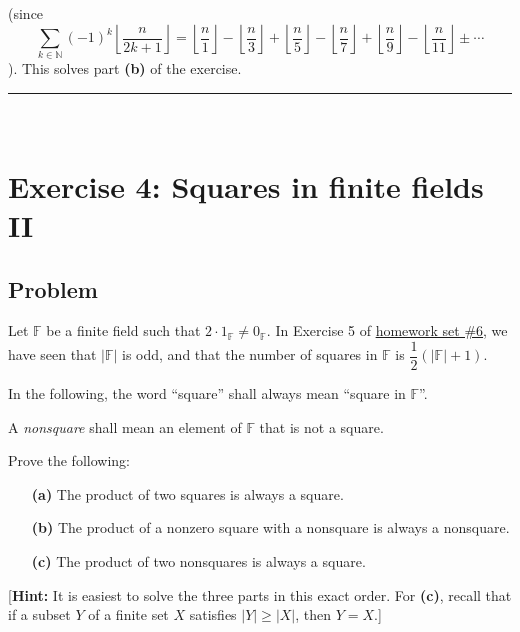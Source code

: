 \documentclass[paper=a4, fontsize=12pt]{scrartcl}%
\let\sumnonlimits\sum
\renewcommand{\sum}{\sumnonlimits\limits}
\theoremstyle{plainsl}
\theoremstyle{definition}
\theoremstyle{remark}
\begin{document}
(since
\[
\sum_{k\in\mathbb{N}}\left(  -1\right)  ^{k}\left\lfloor \dfrac{n}%
{2k+1}\right\rfloor =\left\lfloor \dfrac{n}{1}\right\rfloor -\left\lfloor
\dfrac{n}{3}\right\rfloor +\left\lfloor \dfrac{n}{5}\right\rfloor
-\left\lfloor \dfrac{n}{7}\right\rfloor +\left\lfloor \dfrac{n}{9}%
\right\rfloor -\left\lfloor \dfrac{n}{11}\right\rfloor \pm\cdots
\]
). This solves part \textbf{(b)} of the exercise.

\rule{\linewidth}{0.3pt} \\[0.4cm]

\section{Exercise 4: Squares in finite fields II}

\subsection{Problem}

Let $\mathbb{F}$ be a finite field such that $2\cdot1_{\mathbb{F}}%
\neq0_{\mathbb{F}}$. In Exercise 5 of
\href{http://www.cip.ifi.lmu.de/~grinberg/t/19s/hw6s.pdf}{homework set \#6},
we have seen that $\left\vert \mathbb{F}\right\vert $ is odd, and that the
number of squares in $\mathbb{F}$ is $\dfrac{1}{2}\left(  \left\vert
\mathbb{F}\right\vert +1\right)  $.

In the following, the word ``square'' shall always mean ``square in
$\mathbb{F}$''.

A \textit{nonsquare} shall mean an element of $\mathbb{F}$ that is not a square.

Prove the following:

\begin{enumerate}
\item[\textbf{(a)}] The product of two squares is always a square.

\item[\textbf{(b)}] The product of a nonzero square with a nonsquare is always
a nonsquare.

\item[\textbf{(c)}] The product of two nonsquares is always a square.
\end{enumerate}

[\textbf{Hint:} It is easiest to solve the three parts in this exact order.
For \textbf{(c)}, recall that if a subset $Y$ of a finite set $X$ satisfies
$\left\vert Y\right\vert \geq\left\vert X\right\vert $, then $Y=X$.]
\end{document}
